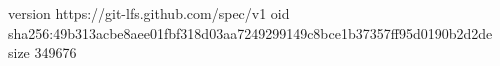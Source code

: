 version https://git-lfs.github.com/spec/v1
oid sha256:49b313acbe8aee01fbf318d03aa7249299149c8bce1b37357ff95d0190b2d2de
size 349676
